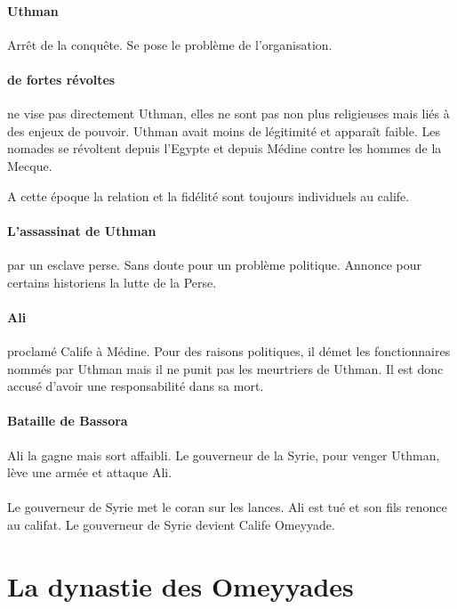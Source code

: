 \paragraph{Uthman} Arrêt de la conquête. Se pose le problème de l'organisation. 

\paragraph{de fortes révoltes}ne vise pas directement Uthman, elles ne sont pas non plus religieuses mais liés à des enjeux de pouvoir. Uthman avait moins de légitimité et apparaît faible.
Les nomades se révoltent depuis l'Egypte et depuis Médine contre les hommes de la Mecque.  

\begin{Prop}
A cette époque la relation et la fidélité sont toujours individuels au calife. 
\end{Prop}

\paragraph{L'assassinat de Uthman } par un esclave perse. Sans doute pour un problème politique. Annonce pour certains historiens la lutte de la Perse.


\paragraph{Ali} proclamé Calife à Médine. Pour des raisons politiques, il démet les fonctionnaires nommés par Uthman mais il ne punit pas les meurtriers de Uthman. Il est donc accusé d'avoir une responsabilité dans sa mort.

\paragraph{Bataille de Bassora} Ali la gagne mais sort affaibli. Le gouverneur de la Syrie, pour venger Uthman, lève une armée et attaque Ali. 

\paragraph{} Le gouverneur de Syrie met le coran sur les lances. Ali est tué et son fils renonce au califat. Le gouverneur de Syrie devient Calife Omeyyade.

 


\section{La dynastie des Omeyyades}


